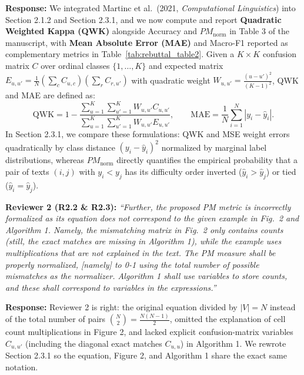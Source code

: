 \documentclass[11pt,a4paper]{article}
\begin{document}
\noindent\textbf{Response:}
We integrated Martinc et al.\ (2021, \textit{Computational Linguistics}) \cite{martinc2021supervised} into Section 2.1.2 and Section 2.3.1, and we now compute and report \textbf{Quadratic Weighted Kappa (QWK)} alongside Accuracy and $PM_{\text{norm}}$ in Table 3 of the manuscript, with \textbf{Mean Absolute Error (MAE)} and Macro-F1 reported as complementary metrics in Table~\ref{tab:rebuttal_table2}. Given a $K \times K$ confusion matrix $C$ over ordinal classes $\{1, \dots, K\}$ and expected matrix $E_{u,u'} = \frac{1}{N} \left(\sum_c C_{u,c}\right)\left(\sum_r C_{r,u'}\right)$ with quadratic weight $W_{u,u'} = \frac{(u - u')^2}{(K - 1)^2}$, QWK and MAE are defined as:
\begin{equation}
\text{QWK} = 1 - \frac{\sum_{u=1}^{K}\sum_{u'=1}^{K} W_{u,u'} C_{u,u'}}{\sum_{u=1}^{K}\sum_{u'=1}^{K} W_{u,u'} E_{u,u'}}, \qquad \text{MAE} = \frac{1}{N}\sum_{i=1}^{N} |y_i - \hat{y}_i|.
\label{eq:rebuttal_qwk_mae}
\end{equation}
In Section 2.3.1, we compare these formulations: QWK and MSE weight errors quadratically by class distance $(y_i - \hat{y}_i)^2$ normalized by marginal label distributions, whereas $PM_{\text{norm}}$ directly quantifies the empirical probability that a pair of texts $(i, j)$ with $y_i < y_j$ has its difficulty order inverted ($\hat{y}_i > \hat{y}_j$) or tied ($\hat{y}_i = \hat{y}_j$).

\begin{reviewbox}
\textbf{Reviewer 2 (R2.2 \& R2.3):} \textit{``Further, the proposed PM metric is incorrectly formalized as its equation does not correspond to the given example in Fig.\ 2 and Algorithm 1. Namely, the mismatching matrix in Fig.\ 2 only contains counts (still, the exact matches are missing in Algorithm 1), while the example uses multiplications that are not explained in the text. The PM measure shall be properly normalized, [namely] to 0-1 using the total number of possible mismatches as the normalizer. Algorithm 1 shall use variables to store counts, and these shall correspond to variables in the expressions.''}
\end{reviewbox}

\noindent\textbf{Response:}
Reviewer 2 is right: the original equation divided by $|V| = N$ instead of the total number of pairs $\binom{N}{2} = \frac{N(N-1)}{2}$, omitted the explanation of cell count multiplications in Figure 2, and lacked explicit confusion-matrix variables $C_{u,u'}$ (including the diagonal exact matches $C_{u,u}$) in Algorithm 1. We rewrote Section 2.3.1 so the equation, Figure 2, and Algorithm 1 share the exact same notation.
\end{document}
